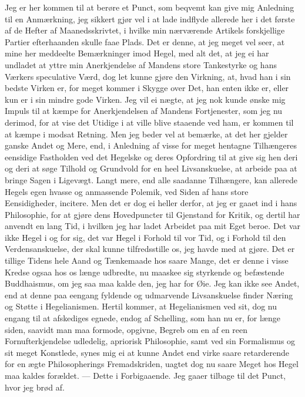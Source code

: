 \documentclass[12pt,a4paper]{book}
\newcommand{\apage}[1]{\marginnote{\footnotesize\textit{[#1]}}}
\begin{document}
\apage{76} Jeg er her kommen til at berøre et Punct, som beqvemt kan give mig
Anledning til en Anmærkning, jeg sikkert gjør vel i at lade indflyde
allerede her i det første af de Hefter af Maanedsskrivtet, i hvilke min
nærværende Artikels forskjellige Partier efterhaanden skulle faae Plads.
Det er denne, at jeg meget vel seer, at mine her meddeelte Bemærkninger
imod Hegel, med alt det, at jeg ei har undladet at yttre min Anerkjendelse
af Mandens store Tankestyrke og hans Værkers speculative Værd, dog let
kunne gjøre den Virkning, at, hvad han i sin bedste Virken er, for meget
kommer i Skygge over Det, han enten ikke er, eller kun er i sin mindre gode
Virken. Jeg vil ei nægte, at jeg nok kunde ønske mig Impuls til at kæmpe
for Anerkjendelsen af Mandens Fortjenester, som jeg nu derimod, for at vise
det Utidige i at ville blive staaende ved ham, er kommen til at kæmpe i
modsat Retning. Men jeg beder vel at bemærke, at det her gjelder ganske
Andet og Mere, end, i Anledning af visse for meget hentagne Tilhængeres
eensidige Fastholden ved det Hegelske og deres Opfordring til at give sig
hen deri og deri at søge Tilhold og Grundvold for en heel Livsanskuelse, at
arbeide paa at bringe Sagen i Ligevægt. Langt mere, end alle saadanne
Tilhængere, kan allerede Hegels egen hvasse og anmassende Polemik, ved
Siden af hans store Eensidigheder, incitere. Men det er dog ei heller
derfor, at jeg er gaaet ind i hans Philosophie, for at gjøre dens
Hovedpuncter til Gjenstand for Kritik, og dertil har anvendt en lang Tid, i
hvilken jeg har ladet Arbeidet paa mit Eget beroe. Det var ikke Hegel i og
for sig, det var Hegel i Forhold til vor Tid, og i Forhold til den
Verdensanskuelse, der skal kunne tilfredsstille os, jeg havde med at gjøre.
Det er tillige Tidens hele Aand og Tænkemaade hos saare Mange, det er denne
i visse Kredse ogsaa hos os længe udbredte, nu maaskee sig styrkende og
befæstende Buddhaismus, om jeg saa maa kalde den, jeg har for Øie. Jeg kan
ikke see Andet, end at denne paa eengang fyldende og \apage{77} udmarvende
Livsanskuelse finder Næring og Støtte i Hegelianismen. Hertil kommer, at
Hegelianismen ved sit, dog nu engang til at afskediges egnede, endog af
Schelling, som han nu er, for længe siden, saavidt man maa formode,
opgivne, Begreb om en af en reen Fornufterkjendelse udledelig, apriorisk
Philosophie, samt ved sin Formalismus og sit meget Konstlede, synes mig ei
at kunne Andet end virke saare retarderende for en ægte Philosopherings
Fremadskriden, uagtet dog nu saare Meget hos Hegel maa kaldes forældet. ---
Dette i Forbigaaende. Jeg gaaer tilbage til det Punct, hvor jeg brød af.
\end{document}
